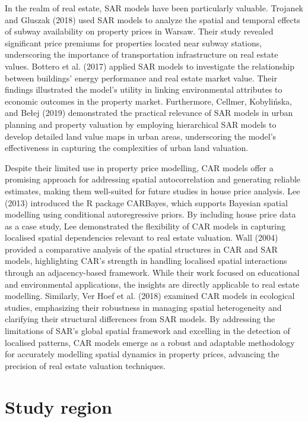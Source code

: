 \documentclass[
  default,
]{sn-jnl}
\begin{document}
In the realm of real estate, SAR models have been particularly valuable.
Trojanek and Gluszak (2018) used SAR models to analyze the spatial and
temporal effects of subway availability on property prices in Warsaw.
Their study revealed significant price premiums for properties located
near subway stations, underscoring the importance of transportation
infrastructure on real estate values. Bottero et al. (2017) applied SAR
models to investigate the relationship between buildings' energy
performance and real estate market value. Their findings illustrated the
model's utility in linking environmental attributes to economic outcomes
in the property market. Furthermore, Cellmer, Kobylińska, and Bełej
(2019) demonstrated the practical relevance of SAR models in urban
planning and property valuation by employing hierarchical SAR models to
develop detailed land value maps in urban areas, underscoring the
model's effectiveness in capturing the complexities of urban land
valuation.

Despite their limited use in property price modelling, CAR models offer
a promising approach for addressing spatial autocorrelation and
generating reliable estimates, making them well-suited for future
studies in house price analysis. Lee (2013) introduced the R package
CARBayes, which supports Bayesian spatial modelling using conditional
autoregressive priors. By including house price data as a case study,
Lee demonstrated the flexibility of CAR models in capturing localised
spatial dependencies relevant to real estate valuation. Wall (2004)
provided a comparative analysis of the spatial structures in CAR and SAR
models, highlighting CAR's strength in handling localised spatial
interactions through an adjacency-based framework. While their work
focused on educational and environmental applications, the insights are
directly applicable to real estate modelling. Similarly, Ver Hoef et al.
(2018) examined CAR models in ecological studies, emphasizing their
robustness in managing spatial heterogeneity and clarifying their
structural differences from SAR models. By addressing the limitations of
SAR's global spatial framework and excelling in the detection of
localised patterns, CAR models emerge as a robust and adaptable
methodology for accurately modelling spatial dynamics in property
prices, advancing the precision of real estate valuation techniques.

\section{Study region}\label{study-region}
\end{document}

